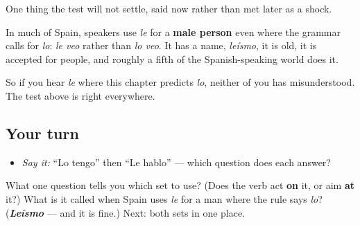 \begin{culture}
One thing the test will not settle, said now rather than met later as a shock.

In much of Spain, speakers use \emph{le} for a \textbf{male person} even where the grammar calls for \emph{lo}: \emph{le veo} rather than \emph{lo veo}. It has a name, \emph{leísmo}, it is old, it is accepted for people, and roughly a fifth of the Spanish-speaking world does it.

So if you hear \emph{le} where this chapter predicts \emph{lo}, neither of you has misunderstood. The test above is right everywhere.
\end{culture}

\subsection*{Your turn}
\begin{itemize}
\raggedright
  \item \emph{Say it:} \textquotedblleft{}Lo tengo\textquotedblright{} then \textquotedblleft{}Le hablo\textquotedblright{} — which question does each answer?
\end{itemize}

\begin{tcolorbox}[breakable,colback=teal!4,colframe=teal!35!black,title={Before you move on}]
What one question tells you which set to use? (Does the verb act \textbf{on} it, or aim \textbf{at} it?) What is it called when Spain uses \emph{le} for a man where the rule says \emph{lo}? (\emph{\textbf{Leísmo}} — and it is fine.) Next: both sets in one place.
\end{tcolorbox}

